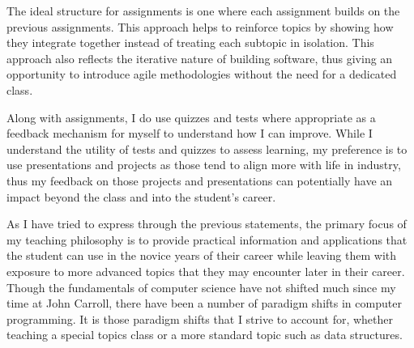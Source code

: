 \documentclass[12pt]{article}
\begin{document}
The ideal structure for assignments is one where each assignment builds on the previous assignments.  This approach helps to reinforce topics by showing how they integrate together instead of treating each subtopic in isolation.  This approach also reflects the iterative nature of building software, thus giving an opportunity to introduce agile methodologies without the need for a dedicated class.  

Along with assignments, I do use quizzes and tests where appropriate as a feedback mechanism for myself to understand how I can improve.  While I understand the utility of tests and quizzes to assess learning, my preference is to use presentations and projects as those tend to align more with life in industry, thus my feedback on those projects and presentations can potentially have an impact beyond the class and into the student's career.

As I have tried to express through the previous statements, the primary focus of my teaching philosophy is to provide practical information and applications that the student can use in the novice years of their career while leaving them with exposure to more advanced topics that they may encounter later in their career.  Though the fundamentals of computer science have not shifted much since my time at John Carroll, there have been a number of paradigm shifts in computer programming.  It is those paradigm shifts that I strive to account for, whether teaching a special topics class or a more standard topic such as data structures.
\end{document}
